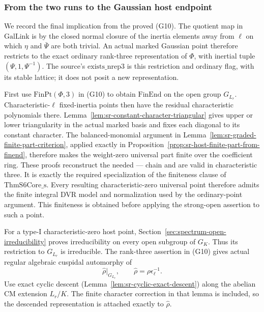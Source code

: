 \subsubsection{From the two runs to the Gaussian host endpoint}
We record the final implication from the proved (G10).
The quotient map in \(\mathrm{GalLink}\) is by the
closed normal closure of the inertia elements away
from \(\ell\) on which
\(\eta\) and \(\bar\Psi\) are both trivial.
An actual marked Gaussian point therefore restricts
to the exact ordinary rank-three representation
of \(\Phi\), with inertial tuple
\((\Psi,1,\Psi^{-1})\).
The source's \(\mathrm{exists\_nrep3}\) is this
restriction and ordinary flag, with its stable lattice;
it does not posit a new representation.

First use \(\mathrm{FinPt}(\Phi,3)\) in (G10) to obtain
\(\mathrm{FinEnd}\) on the open group \(G_{L_r}\).
Characteristic-\(\ell\) fixed-inertia points then have
the residual characteristic polynomials there.
Lemma~\ref{lem:sr-constant-character-triangular}
gives upper or lower triangularity in the actual marked
basis and fixes each diagonal to its constant character.
The balanced-monomial argument in
Lemma~\ref{lem:sr-graded-finite-part-criterion},
applied exactly in
Proposition~\ref{prop:sr-host-finite-part-from-finend},
therefore makes the weight-zero universal part finite
over the coefficient ring.
These proofs reconstruct the needed
----%
 chain and are valid in characteristic three.
It is exactly the required specialization of the
finiteness clause of \(\mathrm{ThmS6Core\_s}\).
Every resulting characteristic-zero universal point
therefore admits the finite integral DVR model and
normalization used by the ordinary-point argument.
This finiteness is obtained before applying the
strong-open assertion to such a point.

For a type-I characteristic-zero host point,
Section~\ref{sec:spectrum-open-irreducibility} proves
irreducibility on every open subgroup of \(G_K\).
Thus its restriction to \(G_{L_r}\) is irreducible.
The rank-three assertion in (G10) gives actual
regular algebraic cuspidal automorphy of
\[
                             \widehat\rho|_{G_{L_r}},
                         \qquad \widehat\rho=\rho\epsilon_\ell^{-1}.
\]
Use exact cyclic descent
(Lemma~\ref{lem:sr-cyclic-exact-descent}) along
the abelian CM extension \(L_r/K\).
The finite character correction in that lemma is
included, so the descended representation is attached
exactly to \(\widehat\rho\).

